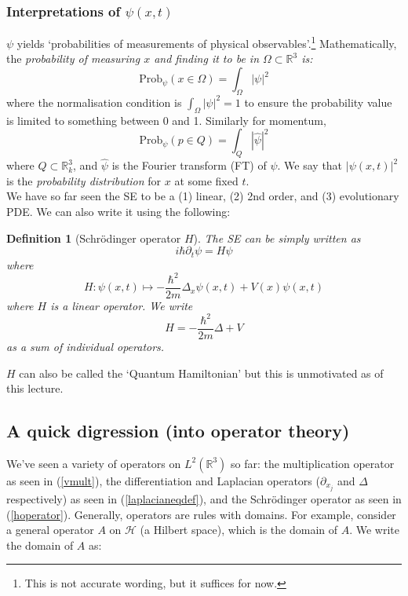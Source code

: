 \documentclass[10pt,a4paper]{report}
\newcommand{\R}{\mathbb{R}}
\newtheorem{definition}{Definition}
\begin{document}
\subsubsection{Interpretations of $\psi(x,t)$}
$\psi$ yields `probabilities of measurements of physical observables'.\footnote{This is not accurate wording, but it suffices for now.} Mathematically, the \textit{probability of measuring $x$ and finding it to be in $\Omega \subset \R^3$ is:}
\begin{equation}
    \text{Prob}_\psi (x\in \Omega) = \int_{\Omega} |\psi|^2
\end{equation}
where the normalisation condition is $\int_\Omega |\psi|^2 = 1$ to ensure the probability value is limited to something between 0 and 1. Similarly for momentum,
\begin{equation}
    \text{Prob}_\psi (p\in Q) = \int_{Q} |\widehat{\psi}|^2
\end{equation}
where $Q\subset \R^3_k$, and $\widehat{\psi}$ is the Fourier transform (FT) of $\psi$. We say that $|\psi(x,t)|^2$ is the \textit{probability distribution} for $x$ at some fixed $t$.\\

We have so far seen the SE to be a (1) linear, (2) 2nd order, and (3) evolutionary PDE. We can also write it using the following:

\begin{definition}[Schrödinger operator $H$] The SE can be simply written as
    \begin{equation}\label{hoperatoralgeqn}
        i \hbar \partial_t \psi = H \psi
    \end{equation}
where 
    \begin{equation}\label{hoperatormathdef}
        H \colon \psi(x,t) \mapsto - \frac{\hbar^2}{2m} \Delta_x \psi(x,t) + V(x) \psi(x,t)
    \end{equation}
where $H$ is a linear operator. We write 
    \begin{equation}\label{hoperator}
        H = - \frac{\hbar^2}{2m} \Delta + V
    \end{equation}
as a sum of individual operators.
\end{definition}
$H$ can also be called the `Quantum Hamiltonian' but this is unmotivated as of this lecture.

\subsection{A quick digression (into operator theory)}
We've seen a variety of operators on $L^2 (\R^3)$ so far: the multiplication operator as seen in (\ref{vmult}), the differentiation and Laplacian operators ($\partial_{x_j}$ and $\Delta$ respectively) as seen in (\ref{laplacianeqdef}), and the Schrödinger operator as seen in (\ref{hoperator}). Generally, operators are rules with domains. For example, consider a general operator $A$ on $\mathcal{H}$ (a Hilbert space), which is the domain of $A$. We write the domain of $A$ as:
\end{document}

